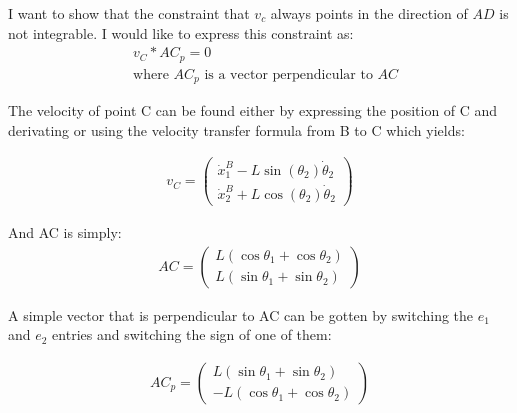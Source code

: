 I want to show that the constraint that $v_c$ always points in the direction of $AD$ is not integrable. I would like to express this constraint as:
\begin{equation}
    \begin{split}
        &v_C * AC_p = 0 \\
        &\text{where }AC_p \text{ is a vector
         perpendicular to }AC
    \end{split}
\end{equation} 

The velocity of point C can be found either by expressing the position of C and derivating or using the velocity transfer formula from B to C which yields:

\begin{equation}
    \begin{split}
        v_C = \begin{pmatrix}
            \dot x_1^B - L\sin(\theta_2)\dot\theta_2\\
            \dot x_2^B + L\cos(\theta_2)\dot\theta_2
        \end{pmatrix}
    \end{split}
\end{equation}

And AC is simply:
\begin{equation}
    \begin{split}
        AC = \begin{pmatrix}
            L\left(\cos\theta_1+\cos\theta_2\right)\\L\left(\sin\theta_1+\sin\theta_2\right)
        \end{pmatrix}
    \end{split}
\end{equation}

A simple vector that is perpendicular to AC can be gotten by switching the $e_1$ and $e_2$ entries and switching the sign of one of them:

\begin{equation}
    \begin{split}
        AC_p = \begin{pmatrix}
            L\left(\sin\theta_1+\sin\theta_2\right)\\
            -L\left(\cos\theta_1+\cos\theta_2\right)
        \end{pmatrix}
    \end{split}
\end{equation}

